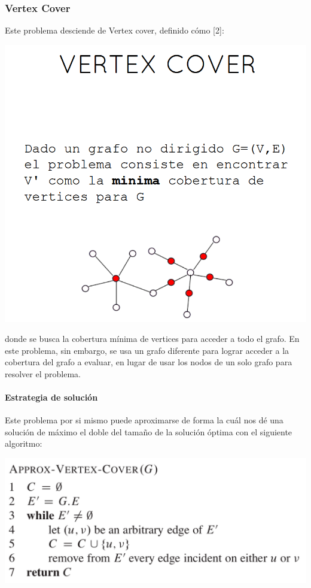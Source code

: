 \documentclass[a4paper]{article}
\begin{document}
\subsubsection{Vertex Cover}
Este problema desciende de Vertex cover, definido cómo [2]:
\begin{center}
    \includegraphics[scale=0.5]{vcover.PNG}    
\end{center}
donde se busca la cobertura mínima de vertices para acceder a todo el grafo. En 
este problema, sin embargo, se usa un grafo diferente para lograr acceder a la cobertura
del grafo a evaluar, en lugar de usar los nodos de un solo grafo para resolver el problema.

\paragraph{Estrategia de solución}
Este problema por si mismo puede aproximarse de forma la cuál nos dé una solución
de máximo el doble del tamaño de la solución óptima con el siguiente algoritmo:
\begin{center}
    \includegraphics[scale=0.5]{aprox.PNG}    
\end{center}
\end{document}
